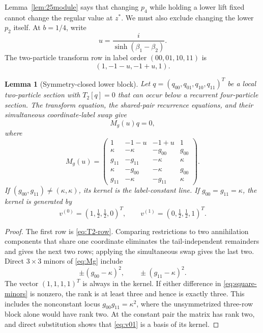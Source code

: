 \documentclass[11pt,reqno]{amsart}
\newtheorem{lemma}[theorem]{Lemma}
\theoremstyle{definition}
\theoremstyle{remark}
\begin{document}
Lemma~\ref{lem:25module} says that changing $p_4$ while holding a lower lift
fixed cannot change the regular value at $z^*$.  We must also exclude changing
the lower $p_2$ itself.  At $b=1/4$, write
\begin{equation}
 u=\frac{i}{\sinh(\beta_1-\beta_2)}.
\end{equation}
The two-particle transform row in label order $(00,01,10,11)$ is
\begin{equation}
 (1,-1-u,-1+u,1).
 \label{eq:T2-row}
\end{equation}

\begin{lemma}[Symmetry-closed lower block]
\label{lem:lower-block}
Let $q=(q_{00},q_{01},q_{10},q_{11})^T$ be a local two-particle section with
$T_2[q]=0$ that can occur below a recurrent four-particle section.  The
transform equation, the shared-pair recurrence equations, and their
simultaneous coordinate-label swap give
\begin{equation}
 M_g(u)q=0,
 \label{eq:Mgq}
\end{equation}
where
\begin{equation}
 M_g(u)=
 \begin{pmatrix}
 1&-1-u&-1+u&1\\
 \kappa&-\kappa&-g_{00}&g_{00}\\
 g_{11}&-g_{11}&-\kappa&\kappa\\
 \kappa&-g_{00}&-\kappa&g_{00}\\
 g_{11}&-\kappa&-g_{11}&\kappa
 \end{pmatrix}.
 \label{eq:Mg}
\end{equation}
If $(g_{00},g_{11})\ne(\kappa,\kappa)$, its kernel is the
label-constant line.  If $g_{00}=g_{11}=\kappa$, the kernel is generated by
\begin{equation}
 v^{(0)}=(1,\tfrac12,\tfrac12,0)^T,
 \qquad
 v^{(1)}=(0,\tfrac12,\tfrac12,1)^T.
 \label{eq:v01}
\end{equation}
\end{lemma}

\begin{proof}
The first row is \eqref{eq:T2-row}.  Comparing restrictions to two
annihilation components that share one coordinate eliminates the
tail-independent remainders and gives the next two rows; applying the
simultaneous swap gives the last two.  Direct $3\times3$ minors of
\eqref{eq:Mg} include
\begin{equation}
 \pm(g_{00}-\kappa)^2,
 \qquad
 \pm(g_{11}-\kappa)^2.
 \label{eq:square-minors}
\end{equation}
The vector $(1,1,1,1)^T$ is always in the kernel.  If either difference in
\eqref{eq:square-minors} is nonzero, the rank is at least three and hence is
exactly three.  This includes the nonconstant locus
$g_{00}g_{11}=\kappa^2$, where the unsymmetrized three-row block alone would
have rank two.  At the constant pair the matrix has rank two, and direct
substitution shows that \eqref{eq:v01} is a basis of its kernel.
\end{proof}
\end{document}
